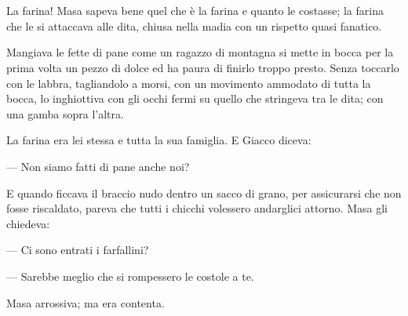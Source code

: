 \chapter{}

La farina! Masa sapeva bene quel che è la farina e quanto le costasse; la farina che le si attaccava alle dita, chiusa nella madia con un rispetto quasi fanatico.

Mangiava le fette di pane come un ragazzo di montagna si mette in bocca per la prima volta un pezzo di dolce ed ha paura di finirlo troppo presto. Senza toccarlo con le labbra, tagliandolo a morsi, con un movimento ammodato di tutta la bocca, lo inghiottiva con gli occhi fermi su quello che stringeva tra le dita; con una gamba sopra l'altra.

La farina era lei stessa e tutta la sua famiglia. E Giacco diceva:

— Non siamo fatti di pane anche noi?

E quando ficcava il braccio nudo dentro un sacco di grano, per assicurarsi che non fosse riscaldato, pareva che tutti i chicchi volessero andarglici attorno. Masa gli chiedeva:

— Ci sono entrati i farfallini?

— Sarebbe meglio che si rompessero le costole a te.

Masa arrossiva; ma era contenta.
